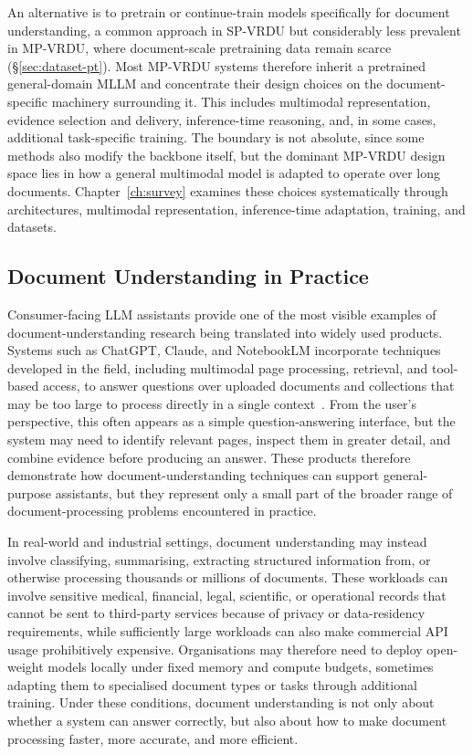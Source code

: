 \documentclass[11pt,twoside,openany]{report}
\begin{document}
An alternative is to pretrain or continue-train models specifically for document understanding, a common approach in SP-VRDU but considerably less prevalent in MP-VRDU, where document-scale pretraining data remain scarce (\S\ref{sec:dataset-pt}). Most MP-VRDU systems therefore inherit a pretrained general-domain MLLM and concentrate their design choices on the document-specific machinery surrounding it. This includes multimodal representation, evidence selection and delivery, inference-time reasoning, and, in some cases, additional task-specific training. The boundary is not absolute, since some methods also modify the backbone itself, but the dominant MP-VRDU design space lies in how a general multimodal model is adapted to operate over long documents. Chapter~\ref{ch:survey} examines these choices systematically through architectures, multimodal representation, inference-time adaptation, training, and datasets.

\subsection{Document Understanding in Practice}
\label{sec:bg-practical}

Consumer-facing LLM assistants provide one of the most visible examples of document-understanding research being translated into widely used products. Systems such as ChatGPT, Claude, and NotebookLM incorporate techniques developed in the field, including multimodal page processing, retrieval, and tool-based access, to answer questions over uploaded documents and collections that may be too large to process directly in a single context~\citep{openai2026projects,openai2026work,anthropic2026ragprojects}. From the user's perspective, this often appears as a simple question-answering interface, but the system may need to identify relevant pages, inspect them in greater detail, and combine evidence before producing an answer. These products therefore demonstrate how document-understanding techniques can support general-purpose assistants, but they represent only a small part of the broader range of document-processing problems encountered in practice.

In real-world and industrial settings, document understanding may instead involve classifying, summarising, extracting structured information from, or otherwise processing thousands or millions of documents. These workloads can involve sensitive medical, financial, legal, scientific, or operational records that cannot be sent to third-party services because of privacy or data-residency requirements, while sufficiently large workloads can also make commercial API usage prohibitively expensive. Organisations may therefore need to deploy open-weight models locally under fixed memory and compute budgets, sometimes adapting them to specialised document types or tasks through additional training. Under these conditions, document understanding is not only about whether a system can answer correctly, but also about how to make document processing faster, more accurate, and more efficient.
\end{document}
